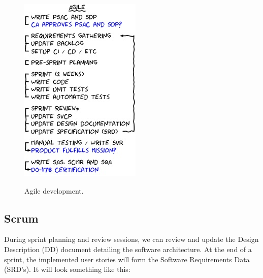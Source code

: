 \documentclass[a4paper]{article}
\begin{document}
\begin{figure}
\includegraphics[width=1\linewidth]{./pictures/agile.jpg}\\
\caption{\label{fig:Agile}Agile development.}
\end{figure}
\newpage

\subsection{Scrum}
During sprint planning and review sessions, we can review and update the Design Description (DD) document detailing the software architecture. At the end of a sprint, the implemented user stories will form the Software Requirements Data (SRD's). It will look something like this:\\
\end{document}
